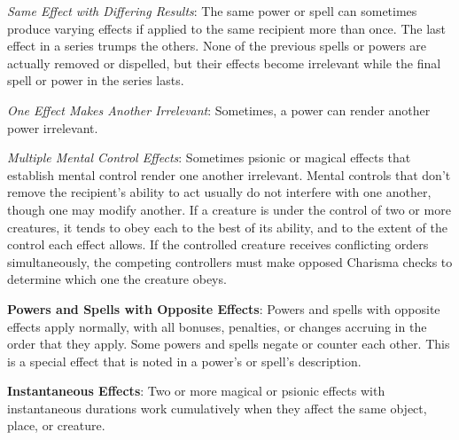 \textit{Same Effect with Differing Results}: The same power or spell can sometimes produce varying effects if applied to the same recipient more than once. The last effect in a series trumps the others. None of the previous spells or powers are actually removed or dispelled, but their effects become irrelevant while the final spell or power in the series lasts.

\textit{One Effect Makes Another Irrelevant}: Sometimes, a power can render another power irrelevant.

\textit{Multiple Mental Control Effects}: Sometimes psionic or magical effects that establish mental control render one another irrelevant. Mental controls that don't remove the recipient's ability to act usually do not interfere with one another, though one may modify another. If a creature is under the control of two or more creatures, it tends to obey each to the best of its ability, and to the extent of the control each effect allows. If the controlled creature receives conflicting orders simultaneously, the competing controllers must make opposed Charisma checks to determine which one the creature obeys.

\textbf{Powers and Spells with Opposite Effects}: Powers and spells with opposite effects apply normally, with all bonuses, penalties, or changes accruing in the order that they apply. Some powers and spells negate or counter each other. This is a special effect that is noted in a power's or spell's description.

\textbf{Instantaneous Effects}: Two or more magical or psionic effects with instantaneous durations work cumulatively when they affect the same object, place, or creature.